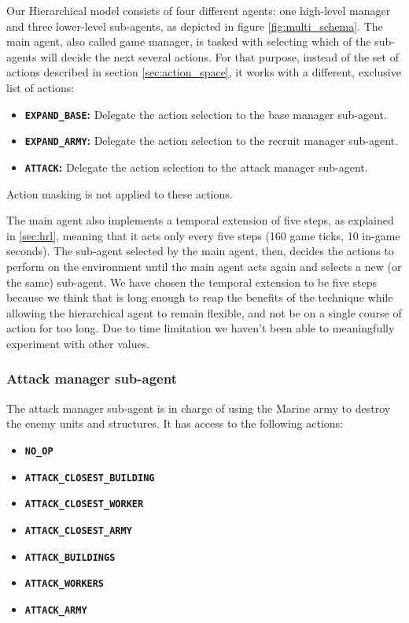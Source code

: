 Our Hierarchical model consists of four different agents: one high-level manager and three lower-level sub-agents, as depicted in figure \ref{fig:multi_schema}. The main agent, also called game manager, is tasked with selecting which of the sub-agents will decide the next several actions. For that purpose, instead of the set of actions described in section \ref{sec:action_space}, it works with a different, exclusive list of actions:

\begin{itemize}
    \item \textbf{\texttt{EXPAND\_BASE}:} Delegate the action selection to the base manager sub-agent.
    \item \textbf{\texttt{EXPAND\_ARMY}:} Delegate the action selection to the recruit manager sub-agent.
    \item \textbf{\texttt{ATTACK}:} Delegate the action selection to the attack manager sub-agent.
\end{itemize}

Action masking is not applied to these actions.

The main agent also implements a temporal extension of five steps, as explained in \ref{sec:hrl}, meaning that it acts only every five steps (160 game ticks, 10 in-game seconds). The sub-agent selected by the main agent, then, decides the actions to perform on the environment until the main agent acts again and selects a new (or the same) sub-agent. We have chosen the temporal extension to be five steps because we think that is long enough to reap the benefits of the technique while allowing the hierarchical agent to remain flexible, and not be  on a single course of action for too long. Due to time limitation we haven't been able to meaningfully experiment with other values.

\subsubsection*{Attack manager sub-agent}

The attack manager sub-agent is in charge of using the Marine army to destroy the enemy units and structures. It has access to the following actions:

\begin{multicols}{2}
\begin{itemize}
    \item \textbf{\texttt{NO\_OP}}
    \item \textbf{\texttt{ATTACK\_CLOSEST\_BUILDING}}
    \item \textbf{\texttt{ATTACK\_CLOSEST\_WORKER}}
    \item \textbf{\texttt{ATTACK\_CLOSEST\_ARMY}}
    \item \textbf{\texttt{ATTACK\_BUILDINGS}}
    \item \textbf{\texttt{ATTACK\_WORKERS}}
    \item \textbf{\texttt{ATTACK\_ARMY}}
\end{itemize}
\end{multicols}

